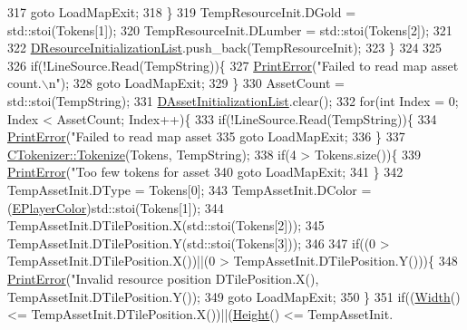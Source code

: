 \begin{DoxyCode}
{{317                 \textcolor{keywordflow}{goto} LoadMapExit;
318             \}
319             TempResourceInit.DGold = std::stoi(Tokens[1]);
320             TempResourceInit.DLumber = std::stoi(Tokens[2]);
321             
322             \hyperlink{classCAssetDecoratedMap_ab4c78aeb90280ea98a3aa542cdb7f8cc}{DResourceInitializationList}.push\_back(TempResourceInit);
323         \}
324         
325         
326         \textcolor{keywordflow}{if}(!LineSource.Read(TempString))\{
327             \hyperlink{Debug_8h_a2ed825eefefe35baf59a93a8c641323d}{PrintError}(\textcolor{stringliteral}{"Failed to read map asset count.\(\backslash\)n"});
328             \textcolor{keywordflow}{goto} LoadMapExit;
329         \}
330         AssetCount = std::stoi(TempString);
331         \hyperlink{classCAssetDecoratedMap_a2b7bf2e9a19a9173093cef32048608c2}{DAssetInitializationList}.clear();
332         \textcolor{keywordflow}{for}(\textcolor{keywordtype}{int} Index = 0; Index < AssetCount; Index++)\{
333             \textcolor{keywordflow}{if}(!LineSource.Read(TempString))\{
334                 \hyperlink{Debug_8h_a2ed825eefefe35baf59a93a8c641323d}{PrintError}(\textcolor{stringliteral}{"Failed to read map asset %
335                 \textcolor{keywordflow}{goto} LoadMapExit;
336             \}
337             \hyperlink{classCTokenizer_a7477f6849a3d0a5154879d8622e4012c}{CTokenizer::Tokenize}(Tokens, TempString);
338             \textcolor{keywordflow}{if}(4 > Tokens.size())\{
339                 \hyperlink{Debug_8h_a2ed825eefefe35baf59a93a8c641323d}{PrintError}(\textcolor{stringliteral}{"Too few tokens for asset %
340                 \textcolor{keywordflow}{goto} LoadMapExit;
341             \}
342             TempAssetInit.DType = Tokens[0];
343             TempAssetInit.DColor = (\hyperlink{GameDataTypes_8h_aafb0ca75933357ff28a6d7efbdd7602f}{EPlayerColor})std::stoi(Tokens[1]);
344             TempAssetInit.DTilePosition.X(std::stoi(Tokens[2]));
345             TempAssetInit.DTilePosition.Y(std::stoi(Tokens[3]));
346             
347             \textcolor{keywordflow}{if}((0 > TempAssetInit.DTilePosition.X())||(0 > TempAssetInit.DTilePosition.Y()))\{
348                 \hyperlink{Debug_8h_a2ed825eefefe35baf59a93a8c641323d}{PrintError}(\textcolor{stringliteral}{"Invalid resource position %
      DTilePosition.X(), TempAssetInit.DTilePosition.Y());
349                 \textcolor{keywordflow}{goto} LoadMapExit;
350             \}
351             \textcolor{keywordflow}{if}((\hyperlink{classCTerrainMap_a34cb754aa9b26e85a73377159f2527d7}{Width}() <= TempAssetInit.DTilePosition.X())||(\hyperlink{classCTerrainMap_ae5e4bf6507e0e3e9ac0322b43eed8a7a}{Height}() <= TempAssetInit.
}}}}}
\end{DoxyCode}
